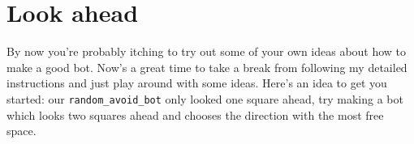 \section{Look ahead}

By now you’re probably itching to try out some of your own ideas about how to
make a good bot. Now’s a great time to take a break from following my detailed
instructions and just play around with some ideas.
Here’s an idea to get you started: our \texttt{random\_avoid\_bot} only looked
one square ahead, try making a bot which looks two squares ahead and chooses the
direction with the most free space.

